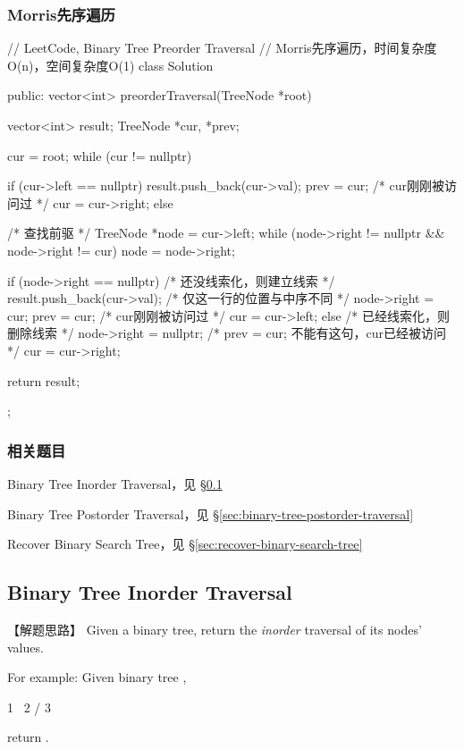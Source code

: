 \subsubsection{Morris先序遍历}
\begin{Code}
	// LeetCode, Binary Tree Preorder Traversal
	// Morris先序遍历，时间复杂度O(n)，空间复杂度O(1)
	class Solution {
		public:
		vector<int> preorderTraversal(TreeNode *root) {
			vector<int> result;
			TreeNode *cur, *prev;
			
			cur = root;
			while (cur != nullptr) {
				if (cur->left == nullptr) {
					result.push_back(cur->val);
					prev = cur; /* cur刚刚被访问过 */
					cur = cur->right;
				} else {
				/* 查找前驱 */
				TreeNode *node = cur->left;
				while (node->right != nullptr && node->right != cur)
				node = node->right;
				
				if (node->right == nullptr) { /* 还没线索化，则建立线索 */
					result.push_back(cur->val); /* 仅这一行的位置与中序不同 */
					node->right = cur;
					prev = cur; /* cur刚刚被访问过 */
					cur = cur->left;
				} else {    /* 已经线索化，则删除线索  */
				node->right = nullptr;
				/* prev = cur; 不能有这句，cur已经被访问 */
				cur = cur->right;
			}
		}
	}
	return result;
}
};
\end{Code}


\subsubsection{相关题目}
\begindot
\item Binary Tree Inorder Traversal，见 \S \ref{sec:binary-tree-inorder-traversal}
\item Binary Tree Postorder Traversal，见 \S \ref{sec:binary-tree-postorder-traversal}
\item Recover Binary Search Tree，见 \S \ref{sec:recover-binary-search-tree}
\myenddot


\subsection{Binary Tree Inorder Traversal}
\label{sec:binary-tree-inorder-traversal}


【解题思路】
Given a binary tree, return the \emph{inorder} traversal of its nodes' values.

For example:
Given binary tree ,
\begin{Code}
	1
	\
	2
	/
	3
\end{Code}
return \code{[1,3,2]}.

